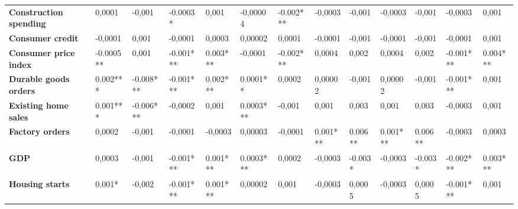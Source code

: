 \begin{landscape}
\begin{table}[]
{\begin{tabular}{@{}lllllllllllll@{}}
\textbf{Construction spending}    & 0,0001              & -0,001              & -0.0003*            & 0,001               & -0,00004            & -0.002***           & -0,0003             & -0,001              & -0,0003             & -0,001              & -0,0003             & 0,001               \\
\textbf{Consumer credit}          & -0,0001             & 0,001               & -0,0001             & 0,0003              & 0,00002             & 0,0001              & -0,0001             & -0,001              & -0,0001             & -0,001              & -0,0001             & 0,001               \\
\textbf{Consumer price index}     & -0.0005**           & 0,001               & -0.001***           & 0.003***            & -0,0001             & -0.002***           & 0,0004              & 0,002               & 0,0004              & 0,002               & -0.001***           & 0.004***            \\
\textbf{Durable goods orders}     & 0.002***            & -0.008***           & -0.001***           & 0.002***            & 0.0001**            & 0,0002              & 0,00002             & -0,001              & 0,00002             & -0,001              & -0.001***           & 0,001               \\
\textbf{Existing home sales}      & 0.001***            & -0.006***           & -0,0002             & 0,001               & 0.0003***           & -0,001              & 0,001               & 0,003               & 0,001               & 0,003               & -0,0003             & 0,001               \\
\textbf{Factory orders}           & 0,0002              & -0,001              & -0,0001             & -0,0003             & 0,00003             & -0,0001             & 0.001***            & 0.006**             & 0.001***            & 0.006**             & -0,0003             & 0,0003              \\
\textbf{GDP}                      & 0,0003              & -0,001              & -0.001***           & 0.001***            & 0.0003***           & 0,0002              & -0,0003             & -0.003*             & -0,0003             & -0.003*             & -0.002***           & 0.003***            \\
\textbf{Housing starts}           & 0.001*              & -0,002              & -0.001***           & 0.001***            & 0,00002             & 0,001               & -0,0003             & 0,0005              & -0,0003             & 0,0005              & -0.001***           & 0,001               \\

\end{tabular}}
\end{table}
\end{landscape}
